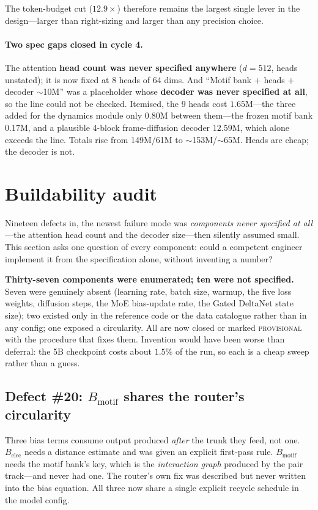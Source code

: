 \documentclass[11pt,a4paper]{article}
\begin{document}
The token-budget cut ($12.9\times$) therefore remains the largest single lever
in the design---larger than right-sizing and larger than any precision choice.

\paragraph{Two spec gaps closed in cycle 4.} The attention \textbf{head count
was never specified anywhere} ($d=512$, heads unstated); it is now fixed at 8
heads of 64 dims. And ``Motif bank + heads + decoder $\sim$10M'' was a
placeholder whose \textbf{decoder was never specified at all}, so the line could
not be checked. Itemised, the 9 heads cost $1.65$M---the three added for the
dynamics module only $0.80$M between them---the frozen motif bank $0.17$M, and a
plausible 4-block frame-diffusion decoder $\mathbf{12.59}$M, which alone exceeds
the line. Totals rise from 149M/61M to $\sim$153M/$\sim$65M. Heads are cheap;
the decoder is not.

\section{Buildability audit}
\label{sec:build}

Nineteen defects in, the newest failure mode was \emph{components never
specified at all}---the attention head count and the decoder size---then
silently assumed small. This section asks one question of every component:
could a competent engineer implement it from the specification alone, without
inventing a number?

\textbf{Thirty-seven components were enumerated; ten were not specified.} Seven
were genuinely absent (learning rate, batch size, warmup, the five loss weights,
diffusion steps, the MoE bias-update rate, the Gated DeltaNet state size); two
existed only in the reference code or the data catalogue rather than in any
config; one exposed a circularity. All are now closed or marked
\textsc{provisional} with the procedure that fixes them. Invention would have
been worse than deferral: the 5B checkpoint costs about $1.5\%$ of the run, so
each is a cheap sweep rather than a guess.

\subsection{Defect \#20: \texorpdfstring{$B_{\mathrm{motif}}$}{B\_motif} shares the router's circularity}

Three bias terms consume output produced \emph{after} the trunk they feed, not
one. $B_{\mathrm{elec}}$ needs a distance estimate and was given an explicit
first-pass rule. $B_{\mathrm{motif}}$ needs the motif bank's key, which is the
\emph{interaction graph} produced by the pair track---and never had one. The
router's own fix was described but never written into the bias equation. All
three now share a single explicit recycle schedule in the model config.
\end{document}
